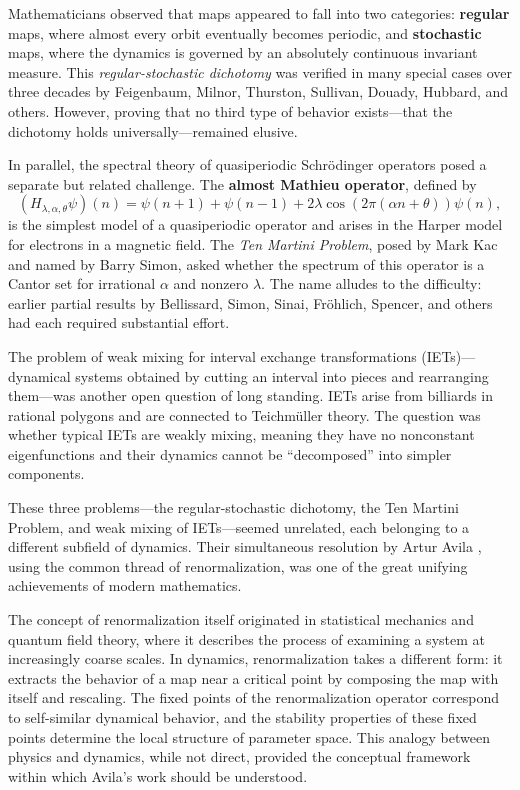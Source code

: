 Mathematicians observed that maps appeared to fall into two categories: \textbf{regular} maps, where almost every orbit eventually becomes periodic, and \textbf{stochastic} maps, where the dynamics is governed by an absolutely continuous invariant measure. This \emph{regular-stochastic dichotomy} was verified in many special cases over three decades by Feigenbaum, Milnor, Thurston, Sullivan, Douady, Hubbard, and others. However, proving that no third type of behavior exists---that the dichotomy holds universally---remained elusive.

In parallel, the spectral theory of quasiperiodic Schr\"{o}dinger operators posed a separate but related challenge. The \textbf{almost Mathieu operator}, defined by
\[
(H_{\lambda,\alpha,\theta}\psi)(n) = \psi(n+1) + \psi(n-1) + 2\lambda\cos(2\pi(\alpha n+\theta))\psi(n),
\]
is the simplest model of a quasiperiodic operator and arises in the Harper model for electrons in a magnetic field. The \emph{Ten Martini Problem}, posed by Mark Kac and named by Barry Simon, asked whether the spectrum of this operator is a Cantor set for irrational $\alpha$ and nonzero $\lambda$. The name alludes to the difficulty: earlier partial results by Bellissard, Simon, Sinai, Fr\"{o}hlich, Spencer, and others had each required substantial effort.

The problem of weak mixing for interval exchange transformations (IETs)---dynamical systems obtained by cutting an interval into pieces and rearranging them---was another open question of long standing. IETs arise from billiards in rational polygons and are connected to Teichm\"{u}ller theory. The question was whether typical IETs are weakly mixing, meaning they have no nonconstant eigenfunctions and their dynamics cannot be ``decomposed'' into simpler components.

These three problems---the regular-stochastic dichotomy, the Ten Martini Problem, and weak mixing of IETs---seemed unrelated, each belonging to a different subfield of dynamics. Their simultaneous resolution by Artur Avila \cite{avila2014}, using the common thread of renormalization, was one of the great unifying achievements of modern mathematics.

The concept of renormalization itself originated in statistical mechanics and quantum field theory, where it describes the process of examining a system at increasingly coarse scales. In dynamics, renormalization takes a different form: it extracts the behavior of a map near a critical point by composing the map with itself and rescaling. The fixed points of the renormalization operator correspond to self-similar dynamical behavior, and the stability properties of these fixed points determine the local structure of parameter space. This analogy between physics and dynamics, while not direct, provided the conceptual framework within which Avila's work should be understood.

